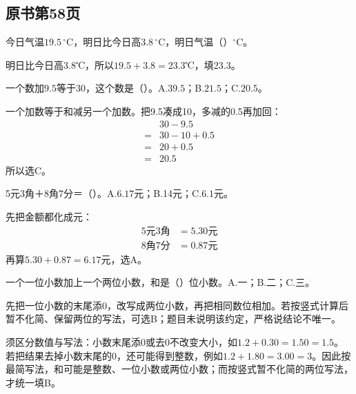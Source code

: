 

\subsection*{原书第58页}

今日气温\(19.5\,{}^\circ\mathrm C\)，明日比今日高\(3.8\,{}^\circ\mathrm C\)，明日气温（\hspace{1.8em}）\({}^\circ\mathrm C\)。\par
\begin{BookAnswer}
明日比今日高3.8℃，所以\(19.5+3.8=23.3\)℃，填23.3。
\end{BookAnswer}

一个数加\(9.5\)等于30，这个数是（\hspace{1.8em}）。A.\(39.5\)；B.\(21.5\)；C.\(20.5\)。\par
\begin{BookAnswer}
一个加数等于和减另一个加数。把9.5凑成10，多减的0.5再加回：\[\begin{aligned}&30-9.5\\={}&30-10+0.5\\={}&20+0.5\\={}&20.5\end{aligned}\]所以选C。
\end{BookAnswer}

5元3角＋8角7分＝（\hspace{1.8em}）。A.\(6.17\)元；B.14元；C.\(6.1\)元。\par
\begin{BookAnswer}
先把金额都化成元：\[\begin{aligned}5\text{元}3\text{角}&=5.30\text{元}\\8\text{角}7\text{分}&=0.87\text{元}\end{aligned}\]再算\(5.30+0.87=6.17\)元，选A。
\end{BookAnswer}

一个一位小数加上一个两位小数，和是（\hspace{1.8em}）位小数。A.一；B.二；C.三。\par
\begin{BookAnswer}
先把一位小数的末尾添0，改写成两位小数，再把相同数位相加。若按竖式计算后暂不化简、保留两位的写法，可选B；题目未说明该约定，严格说结论不唯一。\par 须区分数值与写法：小数末尾添0或去0不改变大小，如\(1.2+0.30=1.50=1.5\)。若把结果去掉小数末尾的0，还可能得到整数，例如\(1.2+1.80=3.00=3\)。因此按最简写法，和可能是整数、一位小数或两位小数；而按竖式暂不化简的两位写法，才统一填B。
\end{BookAnswer}

